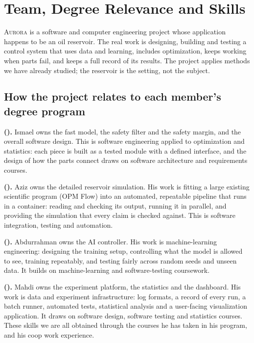 \documentclass[11pt,letterpaper]{article}
\newcommand{\aur}{\textsc{Aurora}}
\begin{document}
\section{Team, Degree Relevance and Skills}\label{sec:team}

\aur{} is a software and computer engineering project whose application happens to be an
oil reservoir. The real work is designing, building and testing a control system that
uses data and learning, includes optimization, keeps working when parts fail, and keeps a
full record of its results. The project applies methods we have already studied; the
reservoir is the setting, not the subject.

\subsection{How the project relates to each member's degree program}

\textbf{\Ismael{} (\IsmaelProg).} Ismael owns the fast model, the safety filter and the
safety margin, and the overall software design. This is software engineering applied to
optimization and statistics: each piece is built as a tested module with a defined
interface, and the design of how the parts connect draws on software architecture and
requirements courses.

\textbf{\Aziz{} (\AzizProg).} Aziz owns the detailed reservoir simulation. His work is
fitting a large existing scientific program (OPM Flow) into an automated, repeatable
pipeline that runs in a container: reading and checking its output, running it in
parallel, and providing the simulation that every claim is checked against. This is
software integration, testing and automation.

\textbf{\Abdu{} (\AbduProg).} Abdurrahman owns the AI controller. His work is
machine-learning engineering: designing the training setup, controlling what the model is
allowed to see, training repeatably, and testing fairly across random seeds and unseen
data. It builds on machine-learning and software-testing coursework.

\textbf{\Mahdi{} (\MahdiProg).} Mahdi owns the experiment platform, the statistics and the
dashboard. His work is data and experiment infrastructure: log formats, a record of every
run, a batch runner, automated tests, statistical analysis and a user-facing visualization
application. It draws on software design, software testing and statistics courses. These skills
we are all obtained through the courses he has taken in his program, and his coop work experience.
\end{document}
